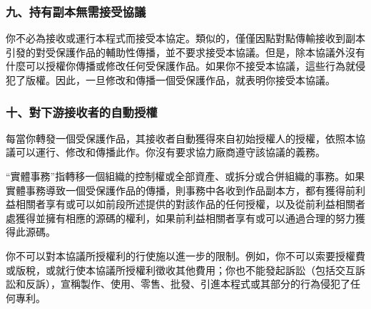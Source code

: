 \subsubsection{九、持有副本無需接受協議}
你不必為接收或運行本程式而接受本協定。類似的，僅僅因點對點傳輸接收到副本引發的對受保護作品的輔助性傳播，並不要求接受本協議。但是，除本協議外沒有什麼可以授權你傳播或修改任何受保護作品。如果你不接受本協議，這些行為就侵犯了版權。因此，一旦修改和傳播一個受保護作品，就表明你接受本協議。
\subsubsection{十、對下游接收者的自動授權}
每當你轉發一個受保護作品，其接收者自動獲得來自初始授權人的授權，依照本協議可以運行、修改和傳播此作。你沒有要求協力廠商遵守該協議的義務。\par
“實體事務”指轉移一個組織的控制權或全部資產、或拆分或合併組織的事務。如果實體事務導致一個受保護作品的傳播，則事務中各收到作品副本方，都有獲得前利益相關者享有或可以如前段所述提供的對該作品的任何授權，以及從前利益相關者處獲得並擁有相應的源碼的權利，如果前利益相關者享有或可以通過合理的努力獲得此源碼。\par
你不可以對本協議所授權利的行使施以進一步的限制。例如，你不可以索要授權費或版稅，或就行使本協議所授權利徵收其他費用；你也不能發起訴訟（包括交互訴訟和反訴），宣稱製作、使用、零售、批發、引進本程式或其部分的行為侵犯了任何專利。
